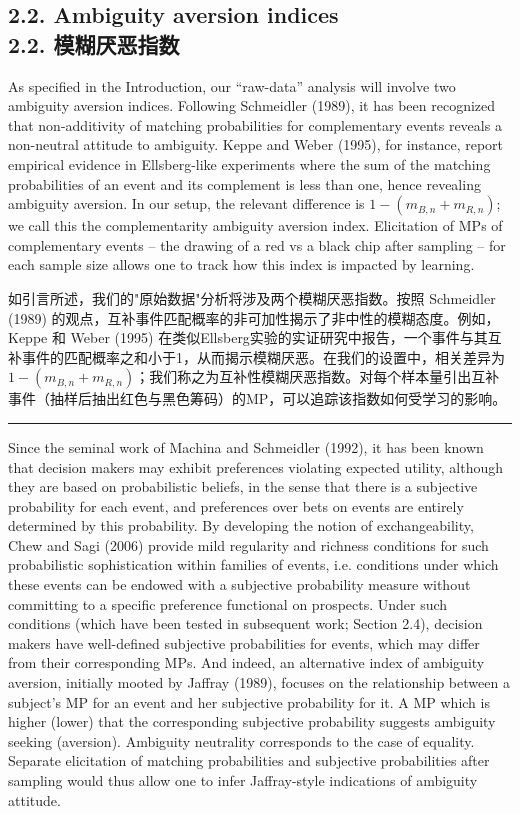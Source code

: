 \documentclass[12pt,a4paper]{article}
\newenvironment{original}
  {\par\vspace{0.5em}\noindent\color{black}\ignorespaces}
  {\par\vspace{0.3em}}
\newenvironment{translation}
  {\par\noindent\color{transblue}\ignorespaces}
  {\par\vspace{0.8em}\hrule\vspace{0.5em}}
\newcommand{\bilingualsubsection}[2]{%
  \subsection{\texorpdfstring{#1 \\[0.2em] {\normalsize\color{transblue}#2}}{#1}}
}
\begin{document}
\bilingualsubsection{2.2. Ambiguity aversion indices}{2.2. 模糊厌恶指数}

\begin{original}
As specified in the Introduction, our ``raw-data'' analysis will involve two ambiguity aversion indices. Following Schmeidler (1989), it has been recognized that non-additivity of matching probabilities for complementary events reveals a non-neutral attitude to ambiguity. Keppe and Weber (1995), for instance, report empirical evidence in Ellsberg-like experiments where the sum of the matching probabilities of an event and its complement is less than one, hence revealing ambiguity aversion. In our setup, the relevant difference is $1 - (m_{B,n} + m_{R,n})$; we call this the complementarity ambiguity aversion index. Elicitation of MPs of complementary events -- the drawing of a red vs a black chip after sampling -- for each sample size allows one to track how this index is impacted by learning.
\end{original}

\begin{translation}
如引言所述，我们的"原始数据"分析将涉及两个模糊厌恶指数。按照 Schmeidler (1989) 的观点，互补事件匹配概率的非可加性揭示了非中性的模糊态度。例如，Keppe 和 Weber (1995) 在类似Ellsberg实验的实证研究中报告，一个事件与其互补事件的匹配概率之和小于1，从而揭示模糊厌恶。在我们的设置中，相关差异为 $1 - (m_{B,n} + m_{R,n})$；我们称之为互补性模糊厌恶指数。对每个样本量引出互补事件（抽样后抽出红色与黑色筹码）的MP，可以追踪该指数如何受学习的影响。
\end{translation}

\begin{original}
Since the seminal work of Machina and Schmeidler (1992), it has been known that decision makers may exhibit preferences violating expected utility, although they are based on probabilistic beliefs, in the sense that there is a subjective probability for each event, and preferences over bets on events are entirely determined by this probability. By developing the notion of exchangeability, Chew and Sagi (2006) provide mild regularity and richness conditions for such probabilistic sophistication within families of events, i.e. conditions under which these events can be endowed with a subjective probability measure without committing to a specific preference functional on prospects. Under such conditions (which have been tested in subsequent work; Section 2.4), decision makers have well-defined subjective probabilities for events, which may differ from their corresponding MPs. And indeed, an alternative index of ambiguity aversion, initially mooted by Jaffray (1989), focuses on the relationship between a subject's MP for an event and her subjective probability for it. A MP which is higher (lower) that the corresponding subjective probability suggests ambiguity seeking (aversion). Ambiguity neutrality corresponds to the case of equality. Separate elicitation of matching probabilities and subjective probabilities after sampling would thus allow one to infer Jaffray-style indications of ambiguity attitude.
\end{original}
\end{document}
